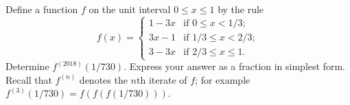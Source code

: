 Define a function $f$ on the unit interval $0\leq x\leq1$ by the rule \[f\left(x\right)=
\begin{cases}
	1-3x & \text{if }0\leq x<1/3;\\
	3x-1 & \text{if }1/3\leq x<2/3;\\
	3-3x & \text{if }2/3\leq x\leq1.
\end{cases}
\]
Determine $f^{\left(2018\right)}\left(1/730\right)$. Express your answer as a fraction in simplest form. Recall that $f^{\left(n\right)}$ denotes the $n$th iterate of $f$; for example $f^{\left(3\right)}\left(1/730\right)=f\left(f\left(f\left(1/730\right)\right)\right)$.